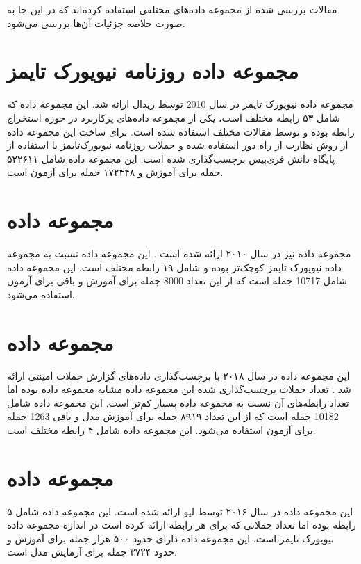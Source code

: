 مقالات بررسی شده از مجموعه داده‌های مختلفی استفاده کرده‌اند که در این جا به صورت
خلاصه جزئیات آن‌ها بررسی می‌شود.

\section{مجموعه داده روزنامه نیویورک تایمز}

مجموعه داده نیویورک تایمز  در سال 2010 توسط ریدال \cite{nyt-dataset} ارائه شد.
این مجموعه داده که شامل ۵۳ رابطه مختلف است،
یکی از مجموعه داده‌های پرکاربرد در حوزه استخراج رابطه بوده و توسط مقالات مختلف استفاده
شده است. برای ساخت این مجموعه داده از روش نظارت از راه دور استفاده شده و جملات روزنامه نیویورک‌تایمز
با استفاده از پایگاه دانش فری‌بیس برچسب‌گذاری شده است.
این مجموعه داده شامل ۵۲۲۶۱۱ جمله برای آموزش و ۱۷۲۴۴۸ جمله برای آزمون است.

\section{مجموعه داده }

مجموعه داده  نیز در سال ۲۰۱۰ ارائه شده است \cite{hendrickx-etal-2010-semeval}.
این مجموعه داده نسبت به مجموعه داده نیویورک تایمز کوچک‌تر بوده و شامل ۱۹ رابطه مختلف است.
این مجموعه داده شامل 10717 جمله است که از این تعداد 8000 جمله برای آموزش و باقی برای آزمون
استفاده می‌شود.

\section{مجموعه داده }

این مجموعه داده در سال ۲۰۱۸ با برچسب‌گذاری داده‌های گزارش‌ حملات امینتی ارائه شد \cite{phandi-etal-2018-semeval}.
تعداد جملات برچسب‌گذاری شده این مجموعه داده مشابه مجموعه داده  بوده اما تعداد
رابطه‌های آن نسبت به مجموعه داده  بسیار کم‌تر است. این مجموعه داده شامل
10182 جمله است که از این تعداد ۸۹۱۹ جمله برای آموزش مدل و باقی 1263 جمله برای آزمون استفاده می‌شود.
این مجموعه داده شامل ۴ رابطه مختلف است.

\section{مجموعه داده }

این مجموعه داده در سال ۲۰۱۶ توسط لیو\cite{liu-etal-2016-effective} ارائه شده است. این مجموعه داده شامل ۵ رابطه
بوده اما تعداد جملاتی که برای هر رابطه ارائه کرده است در اندازه مجموعه داده نیویورک تایمز است. این مجموعه داده دارای
حدود ۵۰۰ هزار جمله برای آموزش و حدود ۳۷۲۴ جمله برای آزمایش مدل است.